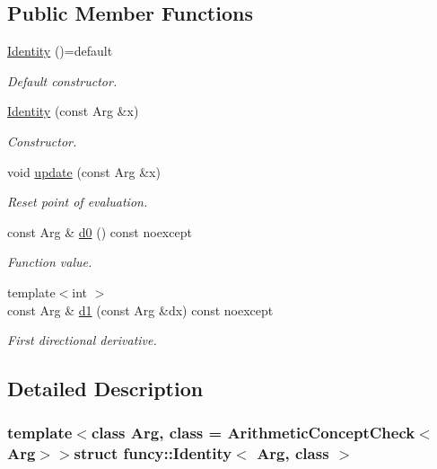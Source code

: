 \subsection*{Public Member Functions}
\begin{DoxyCompactItemize}
\item 
\hyperlink{structfuncy_1_1Identity_a30a563f74f001dab19e85286f1527712}{Identity} ()=default
\begin{DoxyCompactList}\small\item\em Default constructor. \end{DoxyCompactList}\item 
\hyperlink{structfuncy_1_1Identity_a85a31cdcc775ddbe1df64fcce3d503fd}{Identity} (const Arg \&x)
\begin{DoxyCompactList}\small\item\em Constructor. \end{DoxyCompactList}\item 
void \hyperlink{structfuncy_1_1Identity_ac8f1d945d3e0fb818b7d00e5a0969e09}{update} (const Arg \&x)
\begin{DoxyCompactList}\small\item\em Reset point of evaluation. \end{DoxyCompactList}\item 
const Arg \& \hyperlink{structfuncy_1_1Identity_a2c783c9418fac22ca1895e5ca770fa6a}{d0} () const noexcept
\begin{DoxyCompactList}\small\item\em Function value. \end{DoxyCompactList}\item 
{\footnotesize template$<$int $>$ }\\const Arg \& \hyperlink{structfuncy_1_1Identity_aa7b2d9fffa1103c4c0776a06fc62ee0d}{d1} (const Arg \&dx) const noexcept
\begin{DoxyCompactList}\small\item\em First directional derivative. \end{DoxyCompactList}\end{DoxyCompactItemize}


\subsection{Detailed Description}
\subsubsection*{template$<$class Arg, class = Arithmetic\-Concept\-Check$<$\-Arg$>$$>$struct funcy\-::\-Identity$<$ Arg, class $>$}

